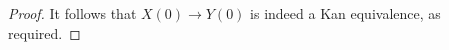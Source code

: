\documentclass[a4paper,10pt
 ,draft
]{article}%
\begin{document}
\begin{proof}
It follows that $X(0) \to Y(0)$ is indeed a Kan equivalence, as required.
%
%
%
%
%
%
\end{proof}
\end{document}
